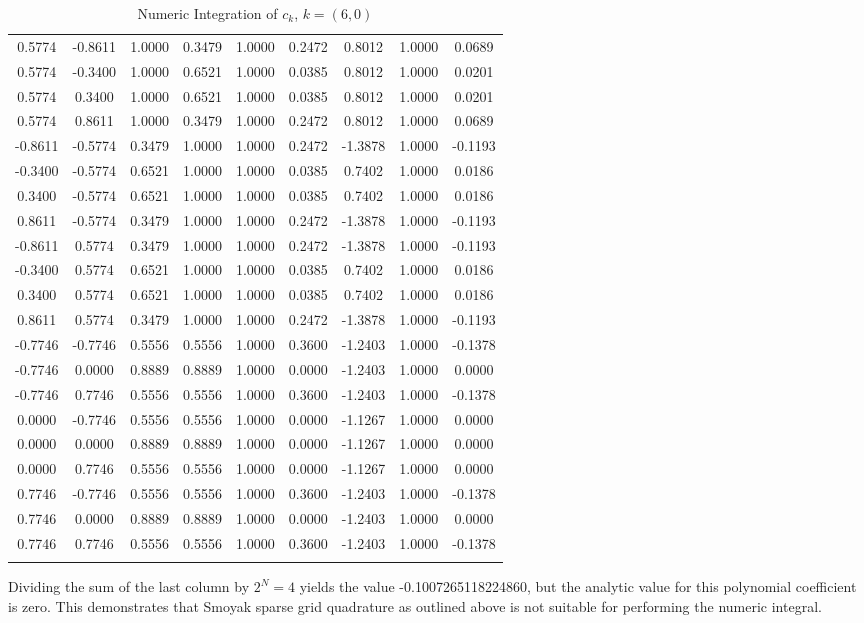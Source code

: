 \documentclass[11pt]{article}
\begin{document}
\begin{longtable}{c c|c c|c|c|c c|c}
0.5774 & -0.8611 & 1.0000 & 0.3479 & 1.0000 & 0.2472 & 0.8012 & 1.0000 & 0.0689 \\
0.5774 & -0.3400 & 1.0000 & 0.6521 & 1.0000 & 0.0385 & 0.8012 & 1.0000 & 0.0201 \\
0.5774 & 0.3400 & 1.0000 & 0.6521 & 1.0000 & 0.0385 & 0.8012 & 1.0000 & 0.0201 \\
0.5774 & 0.8611 & 1.0000 & 0.3479 & 1.0000 & 0.2472 & 0.8012 & 1.0000 & 0.0689 \\
-0.8611 & -0.5774 & 0.3479 & 1.0000 & 1.0000 & 0.2472 & -1.3878 & 1.0000 & -0.1193 \\
-0.3400 & -0.5774 & 0.6521 & 1.0000 & 1.0000 & 0.0385 & 0.7402 & 1.0000 & 0.0186 \\
0.3400 & -0.5774 & 0.6521 & 1.0000 & 1.0000 & 0.0385 & 0.7402 & 1.0000 & 0.0186 \\
0.8611 & -0.5774 & 0.3479 & 1.0000 & 1.0000 & 0.2472 & -1.3878 & 1.0000 & -0.1193 \\
-0.8611 & 0.5774 & 0.3479 & 1.0000 & 1.0000 & 0.2472 & -1.3878 & 1.0000 & -0.1193 \\
-0.3400 & 0.5774 & 0.6521 & 1.0000 & 1.0000 & 0.0385 & 0.7402 & 1.0000 & 0.0186 \\
0.3400 & 0.5774 & 0.6521 & 1.0000 & 1.0000 & 0.0385 & 0.7402 & 1.0000 & 0.0186 \\
0.8611 & 0.5774 & 0.3479 & 1.0000 & 1.0000 & 0.2472 & -1.3878 & 1.0000 & -0.1193 \\
-0.7746 & -0.7746 & 0.5556 & 0.5556 & 1.0000 & 0.3600 & -1.2403 & 1.0000 & -0.1378 \\
-0.7746 & 0.0000 & 0.8889 & 0.8889 & 1.0000 & 0.0000 & -1.2403 & 1.0000 & 0.0000 \\
-0.7746 & 0.7746 & 0.5556 & 0.5556 & 1.0000 & 0.3600 & -1.2403 & 1.0000 & -0.1378 \\
0.0000 & -0.7746 & 0.5556 & 0.5556 & 1.0000 & 0.0000 & -1.1267 & 1.0000 & 0.0000 \\
0.0000 & 0.0000 & 0.8889 & 0.8889 & 1.0000 & 0.0000 & -1.1267 & 1.0000 & 0.0000 \\
0.0000 & 0.7746 & 0.5556 & 0.5556 & 1.0000 & 0.0000 & -1.1267 & 1.0000 & 0.0000 \\
0.7746 & -0.7746 & 0.5556 & 0.5556 & 1.0000 & 0.3600 & -1.2403 & 1.0000 & -0.1378 \\
0.7746 & 0.0000 & 0.8889 & 0.8889 & 1.0000 & 0.0000 & -1.2403 & 1.0000 & 0.0000 \\
0.7746 & 0.7746 & 0.5556 & 0.5556 & 1.0000 & 0.3600 & -1.2403 & 1.0000 & -0.1378 \\
\caption{Numeric Integration of $c_k$, $k=(6,0)$}
\label{tab:6 0}
\end{longtable}
Dividing the sum of the last column by $2^N=4$ yields the value -0.1007265118224860, but the analytic value
for this polynomial coefficient is zero.  This demonstrates that Smoyak sparse grid quadrature as outlined
above is not suitable for performing the numeric integral.
\end{document}
